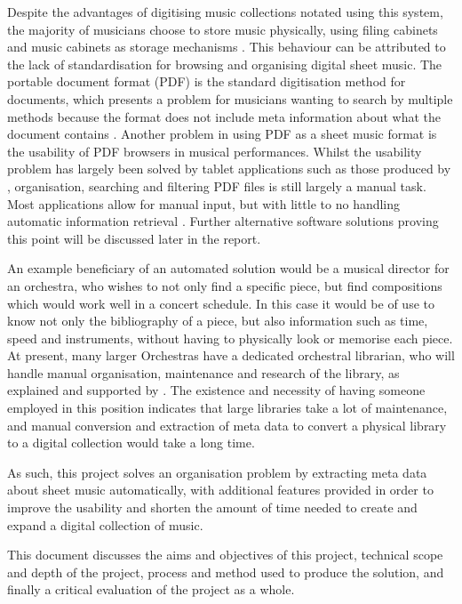 Despite the advantages of digitising music collections notated using this system, the majority of musicians choose to store music physically, using filing cabinets and music cabinets as storage mechanisms \parencite{musicOrganising}. This behaviour can be attributed to the lack of standardisation for browsing and organising digital sheet music. The portable document format (PDF) is the standard digitisation method for documents, which presents a problem for musicians wanting to search by multiple methods because the format does not include meta information about what the document contains \parencite{MusicXMLPresentation}. Another problem in using PDF as a sheet music format is the usability of PDF browsers in musical performances. Whilst the usability problem has largely been solved by tablet applications such as those produced by \cite{forScore}, organisation, searching and filtering PDF files is still largely a manual task. Most applications allow for manual input, but with little to no handling automatic information retrieval \parencite{musicReader}. Further alternative software solutions proving this point will be discussed later in the report.

An example beneficiary of an automated solution would be a musical director for an orchestra, who wishes to not only find a specific piece, but find compositions which would work well in a concert schedule. In this case it would be of use to know not only the bibliography of a piece, but also information such as time, speed and instruments, without having to physically look or memorise each piece. At present, many larger Orchestras have a dedicated orchestral librarian, who will handle manual organisation, maintenance and research of the library, as explained and supported by \cite{MusicLibrarian}. The existence and necessity of having someone employed in this position indicates that large libraries take a lot of maintenance, and manual conversion and extraction of meta data to convert a physical library to a digital collection would take a long time.

As such, this project solves an organisation problem by extracting meta data about sheet music automatically, with additional features provided in order to improve the usability and shorten the amount of time needed to create and expand a digital collection of music.

This document discusses the aims and objectives of this project, technical scope and depth of the project, process and method used to produce the solution, and finally a critical evaluation of the project as a whole.
\pagebreak
